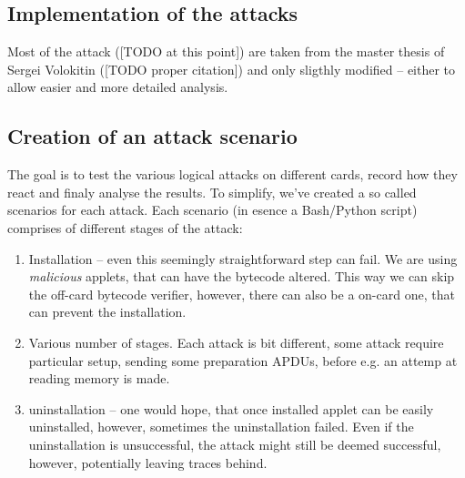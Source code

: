 \documentclass[a4paper]{scrartcl}
\begin{document}
\subsection{Implementation of the attacks}

Most of the attack ([TODO at this point]) are taken from the master thesis of Sergei Volokitin ([TODO proper citation]) and only sligthly modified -- either to allow easier and more detailed analysis.
\subsection{Creation of an attack scenario}

The goal is to test the various logical attacks on different cards, record how they react and finaly analyse the results. To simplify, we've created a so called scenarios for each attack. Each scenario (in esence a Bash/Python script) comprises of different stages of the attack:
\begin{enumerate}
    \item Installation -- even this seemingly straightforward step can fail. We are using \textit{malicious} applets, that can have the bytecode altered. This way we can skip the off-card bytecode verifier, however, there can also be a on-card one, that can prevent the installation.
    \item Various number of stages. Each attack is bit different, some attack require particular setup, sending some preparation APDUs, before e.g. an attemp at reading memory is made.
    \item uninstallation -- one would hope, that once installed applet can be easily uninstalled, however, sometimes the uninstallation failed. Even if the uninstallation is unsuccessful, the attack might still be deemed successful, however, potentially leaving traces behind.
\end{enumerate}
\end{document}
